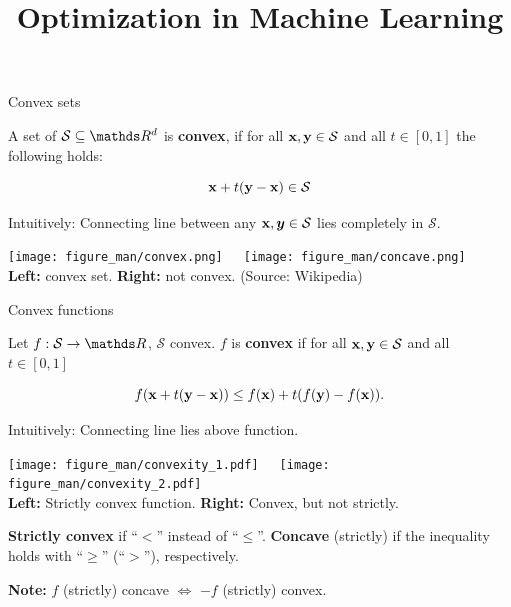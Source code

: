 \documentclass[11pt,compress,t,notes=noshow, xcolor=table]{beamer}
\title{Optimization in Machine Learning}
\date{}
\begin{document}
\lecture{\inserttitle}
\sloppy


\begin{vbframe}{Convex sets}

A set of $\mathcal{S} \subseteq \R^d$ is \textbf{convex}, if for all $\mathbf{x}, \mathbf{y} \in \mathcal{S}$ and all $t \in [0, 1]$ the following holds:

$$
\mathbf{x} + t (\mathbf{y} - \mathbf{x}) \in \mathcal{S}
$$

Intuitively: Connecting line between any $\mathbf{x}, \bm{y} \in \mathcal{S}$ lies completely in $\mathcal{S}$.

\begin{center}
    \texttt{[image: figure\_man/convex.png]}~~~\texttt{[image: figure\_man/concave.png]} \\
    \footnotesize{
        \textbf{Left:} convex set.
        \textbf{Right:} not convex. (Source: Wikipedia)}
\end{center}

\end{vbframe}

\begin{vbframe}{Convex functions}

Let $f: \mathcal{S} \to \R$, $\mathcal{S}$ convex.
$f$ is \textbf{convex} if for all $\mathbf{x}, \mathbf{y} \in \mathcal{S}$ and all $t \in [0, 1]$

\vspace{-0.5\baselineskip}

\begin{equation*}
    f(\mathbf{x} + t(\mathbf{y} - \mathbf{x})) \le f(\mathbf{x}) + t(f(\mathbf{y}) - f(\mathbf{x})).
\end{equation*}

Intuitively: Connecting line lies above function.

\begin{center}
    \texttt{[image: figure\_man/convexity\_1.pdf]}~~~\texttt{[image: figure\_man/convexity\_2.pdf]} \\
    \footnotesize{
        \textbf{Left:} Strictly convex function.
        \textbf{Right:} Convex, but not strictly. }
\end{center}

\textbf{Strictly convex} if \enquote{$<$} instead of \enquote{$\le$}. \textbf{Concave} (strictly) if the inequality holds with \enquote{$\ge$} (\enquote{$>$}), respectively.

\vspace*{0.2cm}

\textbf{Note:} $f$ (strictly) concave $\Leftrightarrow$ $-f$ (strictly) convex.



\end{vbframe}
\end{document}
